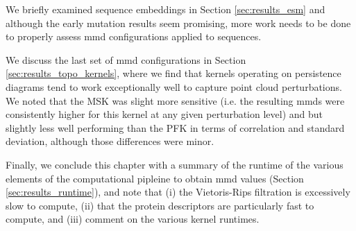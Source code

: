 We briefly examined sequence embeddings in Section \ref{sec:results_esm} and
although the early mutation results seem promising, more work needs to be done
to properly assess \gls{mmd} configurations applied to sequences.

We discuss the last set of \gls{mmd} configurations in Section
\ref{sec:results_topo_kernels}, where we find that kernels operating on
persistence diagrams tend to work exceptionally well to capture point cloud
perturbations. We noted that the MSK was slight more sensitive (i.e. the
resulting \gls{mmd}s were consistently higher for this kernel at any given
perturbation level) and but slightly less well performing than the PFK in terms
of correlation and standard deviation, although those differences were minor.

Finally, we conclude this chapter with a summary of the runtime of the various
elements of the computational pipleine to obtain \gls{mmd} values (Section
\ref{sec:results_runtime}), and note that (i) the Vietoris-Rips filtration is
excessively slow to compute, (ii) that the protein descriptors are particularly
fast to compute, and (iii) comment on the various kernel runtimes.

